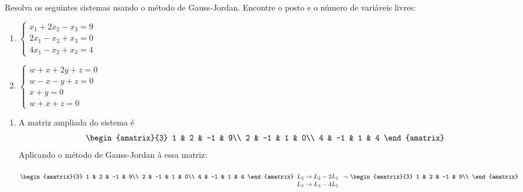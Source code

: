 \begin{exemplo}
    Resolva os seguintes sistemas usando o método de Gauss-Jordan. Encontre o posto e o número de variáveis livres:
    \begin{enumerate}
        \item $\begin{cases}
                x_1 + 2x_2 - x_3 = 9\\
                2x_1 - x_2 + x_3 = 0\\
                4x_1 - x_2 + x_3 = 4
            \end{cases}$

        \item $\begin{cases}
                w + x + 2y + z = 0\\
                w - x - y + z = 0\\
                x + y = 0\\
                w + x + z = 0
        \end{cases}$
    \end{enumerate}
    \begin{solucao}
        \begin{enumerate}
            \item A matriz ampliada do sistema é
                \[
                    \begin{amatrix}{3}
                        1 & 2 & -1 & 9\\
                        2 & -1 & 1 & 0\\
                        4 & -1 & 1 & 4
                    \end{amatrix}
                \]
                Aplicando o método de Gauss-Jordan à essa matriz:
                \begin{align*}
                &\begin{amatrix}{3}
                    1 & 2 & -1 & 9\\
                    2 & -1 & 1 & 0\\
                    4 & -1 & 1 & 4
                \end{amatrix}
                \begin{array}{l}
                    \phantom{x}\\L_2 \to L_2 - 2L_1\\L_3 \to L_3 - 4L_1
                \end{array}\sim
                \begin{amatrix}{3}
                    1 & 2 & -1 & 9\\

\end{amatrix}
\end{align*}
\end{enumerate}
\end{solucao}
\end{exemplo}
